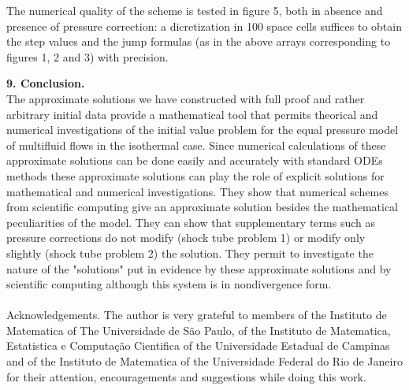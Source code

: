 \documentclass[a4paper,12pt]{article}
\begin{document}
The numerical quality of the scheme is tested in figure 5, both in absence and presence of pressure correction: a dicretization in 100 space cells  suffices to obtain the step values and the jump formulas (as in the above arrays corresponding to figures 1, 2 and 3) with precision.\\

 \begin{figure}[h]\centering\end{figure}



\textbf{9. Conclusion.}\\
 The approximate solutions we have constructed with full proof and rather arbitrary initial data provide a mathematical tool that permits theorical and numerical investigations of the initial value problem for the equal pressure model of multifluid flows in the isothermal case. Since numerical calculations of these approximate solutions can be done easily and accurately with standard ODEs methods these approximate solutions can play the role of explicit solutions for mathematical  and  numerical investigations. They show that  numerical schemes from scientific computing give an approximate solution   besides the mathematical peculiarities of the model. They can show that supplementary terms such as pressure corrections  do not modify (shock tube problem 1) or modify only slightly (shock tube problem 2) the solution. They permit to investigate the nature of the "solutions" put in evidence by these approximate solutions and by scientific computing although this system is in nondivergence form.   \\
\\
 Acknowledgements. The author is very grateful to members of the Instituto de Matematica of The Universidade de S\~ao Paulo, of the Instituto de Matematica, Estatistica e Computa\c c\~ao Cientifica of the Universidade Estadual de Campinas and of the Instituto de Matematica of the Universidade Federal do Rio de Janeiro for their attention, encouragements and suggestions while doing this work.\\
\end{document}
